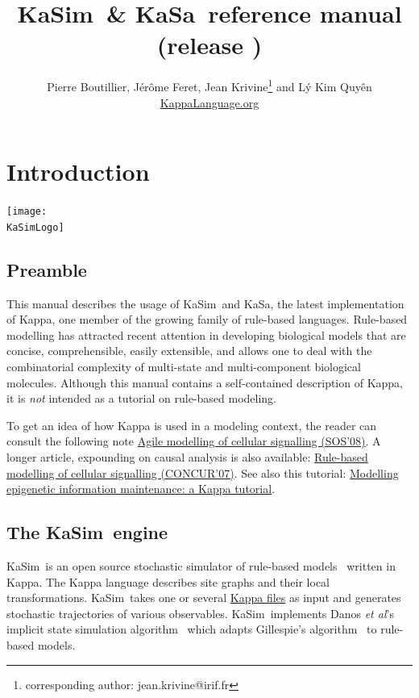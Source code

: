 \documentclass[11pt]{book}
\title{KaSim~\& KaSa~reference manual\\ \small (release \version)}
\author{Pierre Boutillier, J\'er\^ome Feret, Jean Krivine\thanks{corresponding author: jean.krivine@irif.fr} and L\'y Kim Quy\^en \\\href{http://www.kappalanguage.org}{KappaLanguage.org}}
\date{}
\def\KaSimLogo{img/KaSim-Logo.pdf}
\def\KaSim{\textsf{KaSim}}
\def\KaSa{\textsf{KaSa}}
\begin{document}
\maketitle


\tableofcontents
\listoftables

\chapter{Introduction}
\begin{center}\texttt{[image: \\KaSimLogo]}\end{center}

\section{Preamble}
This manual describes the usage of \KaSim~and \KaSa, the latest implementation of Kappa, one member of the growing family of rule-based languages. Rule-based modelling has attracted recent attention in developing biological models that are concise, comprehensible, easily extensible, and allows one to deal with the combinatorial complexity of multi-state and multi-component biological molecules.
Although this manual contains a self-contained description of Kappa, it is \emph{not} intended as a tutorial on rule-based modeling.%
%

To get an idea of how Kappa is used in a modeling context, the reader can consult the following note \href{http://www.research.ed.ac.uk/portal/files/16869853/Agile_Modelling_of_Cellular_Signalling_Invited_Paper_.pdf}{Agile modelling of cellular signalling (SOS'08)}. A longer article, expounding on causal analysis is also available: \href{http://fontana.med.harvard.edu/www/Documents/WF/Papers/signaling.causality.pdf}{Rule-based modelling of cellular signalling (CONCUR'07)}. See also this tutorial: \href{https://hal.archives-ouvertes.fr/hal-00692430}{Modelling epigenetic information maintenance: a Kappa tutorial}.

\section{The \KaSim~engine}
\KaSim~is an open source stochastic simulator of rule-based models~\cite{DanLan04,Dan_etal07a,Fae_etal05} written in Kappa. The Kappa language describes site graphs and their local transformations. \KaSim~takes one or several \hyperref[chap:kappa]{Kappa files} as input and generates stochastic trajectories of various observables. \KaSim~implements Danos \textit{et al}'s implicit state simulation algorithm~\cite{Dan_etal07b} which adapts Gillespie's algorithm~\cite{Gil76,Gil77} to rule-based models.
\end{document}
